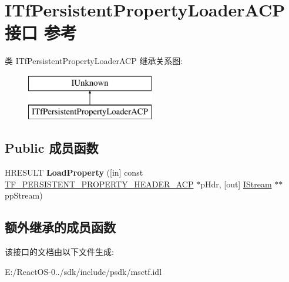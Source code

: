 \hypertarget{interface_i_tf_persistent_property_loader_a_c_p}{}\section{I\+Tf\+Persistent\+Property\+Loader\+A\+C\+P接口 参考}
\label{interface_i_tf_persistent_property_loader_a_c_p}
类 I\+Tf\+Persistent\+Property\+Loader\+A\+CP 继承关系图\+:\begin{figure}[H]
\begin{center}
\leavevmode
\includegraphics[height=2.000000cm]{interface_i_tf_persistent_property_loader_a_c_p}
\end{center}
\end{figure}
\subsection*{Public 成员函数}
\begin{DoxyCompactItemize}
\item 
\mbox{\label{interface_i_tf_persistent_property_loader_a_c_p_a5542085dee91d6e0a0f27c18e54401d0}} 
H\+R\+E\+S\+U\+LT {\bfseries Load\+Property} (\mbox{[}in\mbox{]} const \hyperlink{struct_t_f___p_e_r_s_i_s_t_e_n_t___p_r_o_p_e_r_t_y___h_e_a_d_e_r___a_c_p}{T\+F\+\_\+\+P\+E\+R\+S\+I\+S\+T\+E\+N\+T\+\_\+\+P\+R\+O\+P\+E\+R\+T\+Y\+\_\+\+H\+E\+A\+D\+E\+R\+\_\+\+A\+CP} $\ast$p\+Hdr, \mbox{[}out\mbox{]} \hyperlink{interface_i_stream}{I\+Stream} $\ast$$\ast$pp\+Stream)
\end{DoxyCompactItemize}
\subsection*{额外继承的成员函数}


该接口的文档由以下文件生成\+:\begin{DoxyCompactItemize}
\item 
E\+:/\+React\+O\+S-\/0../sdk/include/psdk/msctf.\+idl\end{DoxyCompactItemize}
